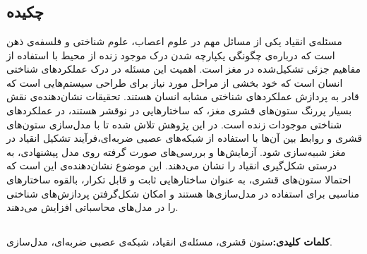 \documentclass[12pt]{report}
\begin{document}
	\pagestyle{empty}
	\pagenumbering{}
	
	\newpage
	\pagestyle{plain}
	\setcounter{page}{1}
	
	
	\chapter*{}
	\section*{چکیده}
	مسئله‌ی انقیاد یکی از مسائل مهم در علوم اعصاب، علوم شناختی و فلسفه‌ی ذهن است که درباره‌ی چگونگی یکپارچه شدن درک موجود زنده از محیط با استفاده از مفاهیم جزئی تشکیل‌شده در مغز است. اهمیت این مسئله در درک عملکرد‌‌های شناختی انسان است که خود بخشی از مراحل مورد نیاز برای طراحی سیستم‌هایی است که قادر به پردازش عملکرد‌های شناختی مشابه انسان هستند. تحقیقات نشان‌دهنده‌ی نقش بسیار پررنگ ستون‌های قشری مغز، که ساختار‌هایی در نوقشر هستند، در عملکرد‌های شناختی موجودات زنده است. در این پژوهش تلاش شده تا با مدل‌سازی ستون‌های قشری و روابط بین آن‌ها با استفاده از شبکه‌های عصبی ضربه‌ای،فرآیند تشکیل انقیاد در مغز شبیه‌سازی شود.  آزمایش‌ها و بررسی‌های صورت گرفته روی مدل پیشنهادی، به درستی شکل‌گیری انقیاد را نشان می‌دهند. این موضوع نشان‌دهنده‌ی این است که احتمالا ستون‌های قشری، به عنوان ساختار‌هایی ثابت و قابل تکرار، بالقوه ساختار‌های مناسبی برای استفاده در مدل‌سازی‌ها هستند و امکان شکل‌‌گرفتن پردازش‌های شناختی را در مدل‌های محاسباتی افزایش می‌دهند. 
	
	\section*{}
	\textbf{کلمات کلیدی:}\quad ستون قشری، مسئله‌ی انقیاد، شبکه‌ی عصبی ضربه‌ای، مدل‌سازی.
	
	
	
	
\end{document}

